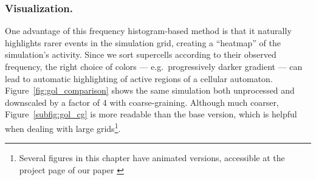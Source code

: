 \subsubsection{Visualization.}
One advantage of this frequency histogram-based method is that it naturally
highlights rarer events in the simulation grid, creating a ``heatmap'' of the
simulation's activity. Since we sort supercells according to their observed
frequency, the right choice of colors --- e.g.\ progressively darker gradient ---
can lead to automatic highlighting of active regions of a cellular automaton.
Figure~\ref{fig:gol_comparison} shows the same simulation both unprocessed and
downscaled by a factor of 4 with coarse-graining. Although much coarser,
Figure~\ref{subfig:gol_cg} is more readable than the base version, which is
helpful when dealing with large grids\footnote{Several figures in this chapter
  have animated versions, accessible at the project page of our paper
  \parencite{cisnerosVisualizingComputationLargescale2020} \projecturl}.

